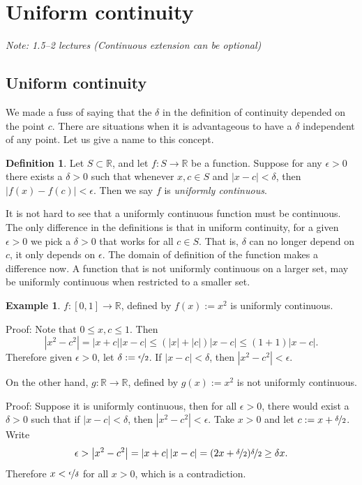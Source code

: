 \documentclass[12pt]{book}
\newcommand{\abs}[1]{\left\lvert {#1} \right\rvert}
\newcommand{\R}{{\mathbb{R}}}
\newcommand{\myindex}[1]{#1\index{#1}}
\newcommand{\sectionnotes}[1]{\noindent \emph{Note: #1} \medskip \par}
\newcommand{\sectionnewpage}{\clearpage}
\theoremstyle{plain}
\theoremstyle{remark}
\theoremstyle{definition}
\newtheorem{defn}[thm]{Definition}
\theoremstyle{exercise}
\theoremstyle{example}
\newtheorem{example}[thm]{Example}
\begin{document}
\sectionnewpage
\section{Uniform continuity}
\label{sec:unifcont}

\sectionnotes{1.5--2 lectures (Continuous extension can be
optional)}

\subsection{Uniform continuity}

We made a fuss of saying that the $\delta$ in the definition of
continuity depended on the point $c$.  There are situations when it is
advantageous to have a $\delta$ independent of any point.  Let
us give a name to this concept.

\begin{defn}
Let $S \subset \R$, and let $f \colon S \to \R$ be a function.
Suppose for any $\epsilon > 0$ there exists a $\delta > 0$
such that whenever $x, c \in S$ and
$\abs{x-c} < \delta$, then $\abs{f(x)-f(c)} < \epsilon$.
Then we say $f$ is \emph{\myindex{uniformly continuous}}.
\end{defn}

It is not hard to see that a uniformly continuous function
must be continuous.
The only difference in the definitions
is that in uniform continuity, for a given $\epsilon > 0$ we pick a $\delta > 0$ that
works for all $c \in S$.  That is, $\delta$ can no longer depend on $c$,
it only depends on $\epsilon$.  The domain of definition
of the function makes a difference now.  A function that is not uniformly
continuous on a larger set, may be uniformly continuous when restricted to a
smaller set.

\begin{example}
$f \colon [0,1] \to \R$, defined by $f(x) := x^2$ is uniformly continuous.

Proof: Note that $0 \leq x,c \leq 1$.  Then
\begin{equation*}
\abs{x^2-c^2} = \abs{x+c}\abs{x-c}
\leq (\abs{x}+\abs{c}) \abs{x-c}
\leq (1+1)\abs{x-c} .
\end{equation*}
Therefore given $\epsilon > 0$, let $\delta := \nicefrac{\epsilon}{2}$.
If $\abs{x-c} < \delta$, then $\abs{x^2-c^2} < \epsilon$.

\medskip

On the other hand, $g \colon \R \to \R$, defined by $g(x) := x^2$ is not uniformly
continuous.

Proof: Suppose it is uniformly continuous, then for all $\epsilon > 0$,
there would exist a $\delta > 0$ such that
if $\abs{x-c} < \delta$, then $\abs{x^2 -c^2} < \epsilon$.
Take $x > 0$ and let
$c := x+\nicefrac{\delta}{2}$.  Write
\begin{equation*}
\epsilon >
\abs{x^2-c^2} = \abs{x+c}\abs{x-c}
=
(2x+\nicefrac{\delta}{2})\nicefrac{\delta}{2} 
\geq 
\delta x .
\end{equation*}
Therefore $x < \nicefrac{\epsilon}{\delta}$ for all $x > 0$, which is a
contradiction.
\end{example}
\end{document}
